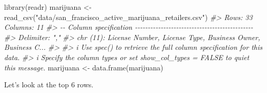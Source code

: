 \documentclass[
]{krantz}
\makeatletter
\newenvironment{Shaded}{\begin{snugshade}}{\end{snugshade}}
\newcommand{\CommentTok}[1]{\textcolor[rgb]{0.37,0.37,0.37}{\textit{#1}}}
\newcommand{\FunctionTok}[1]{\textcolor[rgb]{0,0,0}{#1}}
\newcommand{\NormalTok}[1]{#1}
\newcommand{\OtherTok}[1]{\textcolor[rgb]{0.37,0.37,0.37}{#1}}
\newcommand{\StringTok}[1]{\textcolor[rgb]{0.5,0.5,0.5}{#1}}
\newenvironment{kframe}{%
\medskip{}
\setlength{\fboxsep}{.8em}
 \def\at@end@of@kframe{}%
 \ifinner\ifhmode%
  \def\at@end@of@kframe{\end{minipage}}%
  \begin{minipage}{\columnwidth}%
 \fi\fi%
 \def\FrameCommand##1{\hskip\@totalleftmargin \hskip-\fboxsep
 \colorbox{shadecolor}{##1}\hskip-\fboxsep
     \hskip-\linewidth \hskip-\@totalleftmargin \hskip\columnwidth}%
 \MakeFramed {\advance\hsize-\width
   \@totalleftmargin\z@ \linewidth\hsize
   \@setminipage}}%
 {\par\unskip\endMakeFramed%
 \at@end@of@kframe}
\renewenvironment{Shaded}{\begin{kframe}}{\end{kframe}}
\makeatother
\begin{document}
\begin{Shaded}
\begin{Highlighting}[]
\FunctionTok{library}\NormalTok{(readr)}
\NormalTok{marijuana }\OtherTok{\textless{}{-}} \FunctionTok{read\_csv}\NormalTok{(}\StringTok{"data/san\_francisco\_active\_marijuana\_retailers.csv"}\NormalTok{)}
\CommentTok{\#\textgreater{} Rows: 33 Columns: 11}
\CommentTok{\#\textgreater{} {-}{-} Column specification {-}{-}{-}{-}{-}{-}{-}{-}{-}{-}{-}{-}{-}{-}{-}{-}{-}{-}{-}{-}{-}{-}{-}{-}{-}{-}{-}{-}{-}{-}{-}{-}{-}{-}{-}{-}{-}{-}{-}{-}{-}{-}{-}{-}{-}{-}}
\CommentTok{\#\textgreater{} Delimiter: ","}
\CommentTok{\#\textgreater{} chr (11): License Number, License Type, Business Owner, Business C...}
\CommentTok{\#\textgreater{} }
\CommentTok{\#\textgreater{} i Use \textasciigrave{}spec()\textasciigrave{} to retrieve the full column specification for this data.}
\CommentTok{\#\textgreater{} i Specify the column types or set \textasciigrave{}show\_col\_types = FALSE\textasciigrave{} to quiet this message.}
\NormalTok{marijuana }\OtherTok{\textless{}{-}} \FunctionTok{data.frame}\NormalTok{(marijuana)}
\end{Highlighting}
\end{Shaded}

Let's look at the top 6 rows.
\end{document}
